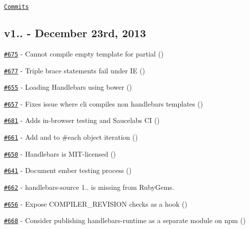 \href{https://github.com/wycats/handlebars.js/compare/v1.2.0...v1.2.1}{\tt Commits}

\subsection*{v1.. -\/ December 23rd, 2013}


\begin{DoxyItemize}
\item \href{https://github.com/wycats/handlebars.js/issues/675}{\tt \#675} -\/ Cannot compile empty template for partial (\href{https://api.github.com/users/erwinw}{\tt })
\item \href{https://github.com/wycats/handlebars.js/issues/677}{\tt \#677} -\/ Triple brace statements fail under IE (\href{https://api.github.com/users/hamzaCM}{\tt })
\item \href{https://github.com/wycats/handlebars.js/issues/655}{\tt \#655} -\/ Loading Handlebars using bower (\href{https://api.github.com/users/niki4810}{\tt })
\item \href{https://github.com/wycats/handlebars.js/pull/657}{\tt \#657} -\/ Fixes issue where cli compiles non handlebars templates (\href{https://api.github.com/users/chrishoage}{\tt })
\item \href{https://github.com/wycats/handlebars.js/pull/681}{\tt \#681} -\/ Adds in-\/browser testing and Saucelabs CI (\href{https://api.github.com/users/kpdecker}{\tt })
\item \href{https://github.com/wycats/handlebars.js/pull/661}{\tt \#661} -\/ Add  and  to \#each object iteration (\href{https://api.github.com/users/cgp}{\tt })
\item \href{https://github.com/wycats/handlebars.js/pull/650}{\tt \#650} -\/ Handlebars is M\+I\+T-\/licensed (\href{https://api.github.com/users/thomasboyt}{\tt })
\item \href{https://github.com/wycats/handlebars.js/pull/641}{\tt \#641} -\/ Document ember testing process (\href{https://api.github.com/users/kpdecker}{\tt })
\item \href{https://github.com/wycats/handlebars.js/issues/662}{\tt \#662} -\/ handlebars-\/source 1.. is missing from Ruby\+Gems.
\item \href{https://github.com/wycats/handlebars.js/issues/656}{\tt \#656} -\/ Expose C\+O\+M\+P\+I\+L\+E\+R\+\_\+\+R\+E\+V\+I\+S\+I\+ON checks as a hook (\href{https://api.github.com/users/machty}{\tt })
\item \href{https://github.com/wycats/handlebars.js/issues/668}{\tt \#668} -\/ Consider publishing handlebars-\/runtime as a separate module on npm (\href{https://api.github.com/users/dlmanning}{\tt })

\end{DoxyItemize}
